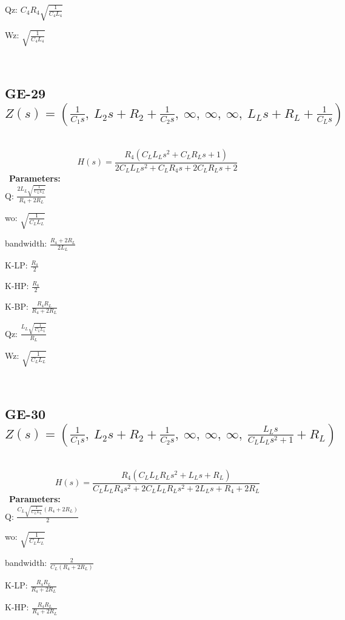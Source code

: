 \documentclass{article}
\begin{document}
Qz: $C_{4} R_{4} \sqrt{\frac{1}{C_{4} L_{4}}}$\ 

Wz: $\sqrt{\frac{1}{C_{4} L_{4}}}$\ 

\ 

\subsection{GE-29 $Z(s) = \left( \frac{1}{C_{1} s}, \  L_{2} s + R_{2} + \frac{1}{C_{2} s}, \  \infty, \  \infty, \  \infty, \  L_{L} s + R_{L} + \frac{1}{C_{L} s}\right)$ } \ 
\textbf{\[H(s) = \frac{R_{4} \left(C_{L} L_{L} s^{2} + C_{L} R_{L} s + 1\right)}{2 C_{L} L_{L} s^{2} + C_{L} R_{4} s + 2 C_{L} R_{L} s + 2}\] } \ 
\textbf{Parameters:}\\ 

Q: $\frac{2 L_{L} \sqrt{\frac{1}{C_{L} L_{L}}}}{R_{4} + 2 R_{L}}$\ 

wo: $\sqrt{\frac{1}{C_{L} L_{L}}}$\ 

bandwidth: $\frac{R_{4} + 2 R_{L}}{2 L_{L}}$\ 

K-LP: $\frac{R_{4}}{2}$\ 

K-HP: $\frac{R_{4}}{2}$\ 

K-BP: $\frac{R_{4} R_{L}}{R_{4} + 2 R_{L}}$\ 

Qz: $\frac{L_{L} \sqrt{\frac{1}{C_{L} L_{L}}}}{R_{L}}$\ 

Wz: $\sqrt{\frac{1}{C_{L} L_{L}}}$\ 

\ 

\subsection{GE-30 $Z(s) = \left( \frac{1}{C_{1} s}, \  L_{2} s + R_{2} + \frac{1}{C_{2} s}, \  \infty, \  \infty, \  \infty, \  \frac{L_{L} s}{C_{L} L_{L} s^{2} + 1} + R_{L}\right)$ } \ 
\textbf{\[H(s) = \frac{R_{4} \left(C_{L} L_{L} R_{L} s^{2} + L_{L} s + R_{L}\right)}{C_{L} L_{L} R_{4} s^{2} + 2 C_{L} L_{L} R_{L} s^{2} + 2 L_{L} s + R_{4} + 2 R_{L}}\] } \ 
\textbf{Parameters:}\\ 

Q: $\frac{C_{L} \sqrt{\frac{1}{C_{L} L_{L}}} \left(R_{4} + 2 R_{L}\right)}{2}$\ 

wo: $\sqrt{\frac{1}{C_{L} L_{L}}}$\ 

bandwidth: $\frac{2}{C_{L} \left(R_{4} + 2 R_{L}\right)}$\ 

K-LP: $\frac{R_{4} R_{L}}{R_{4} + 2 R_{L}}$\ 

K-HP: $\frac{R_{4} R_{L}}{R_{4} + 2 R_{L}}$\ 
\end{document}
